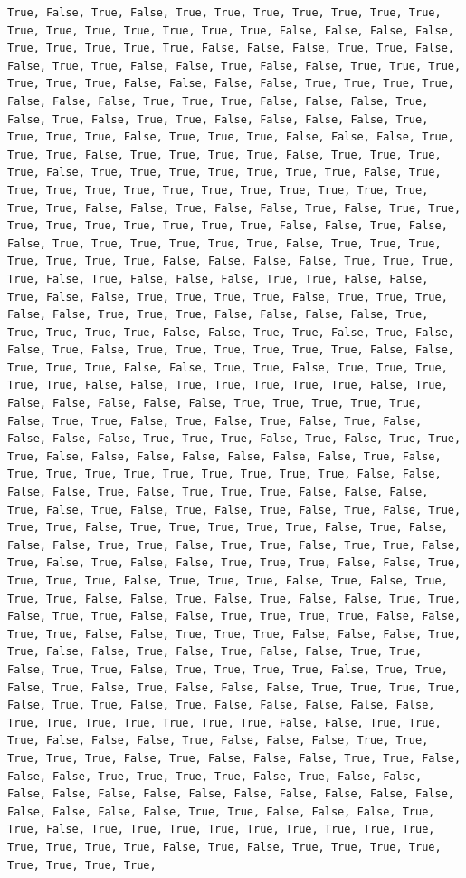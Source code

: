 \documentclass[
  letterpaper,
  DIV=11,
  numbers=noendperiod]{scrartcl}
\begin{document}
\begin{verbatim}
True, False, True, False, True, True, True, True, True, True, True, True, True, True, True, True, True, True, False, False, False, False, True, True, True, True, True, False, False, False, True, True, False, False, True, True, False, False, True, False, False, True, True, True, True, True, True, False, False, False, False, True, True, True, True, False, False, False, True, True, True, False, False, False, True, False, True, False, True, True, False, False, False, False, True, True, True, True, False, True, True, True, False, False, False, True, True, True, False, True, True, True, True, False, True, True, True, True, False, True, True, True, True, True, True, True, False, True, True, True, True, True, True, True, True, True, True, True, True, True, True, False, False, True, False, False, True, False, True, True, True, True, True, True, True, True, True, False, False, True, False, False, True, True, True, True, True, True, False, True, True, True, True, True, True, True, False, False, False, False, True, True, True, True, False, True, False, False, False, True, True, False, False, True, False, False, True, True, True, True, False, True, True, True, False, False, True, True, True, False, False, False, False, True, True, True, True, True, False, False, True, True, False, True, False, False, True, False, True, True, True, True, True, True, False, False, True, True, True, False, False, True, True, False, True, True, True, True, True, False, False, True, True, True, True, True, False, True, False, False, False, False, False, True, True, True, True, True, False, True, True, False, True, False, True, False, True, False, False, False, False, True, True, True, False, True, False, True, True, True, False, False, False, False, False, False, False, True, False, True, True, True, True, True, True, True, True, True, False, False, False, False, True, False, True, True, True, False, False, False, True, False, True, False, True, False, True, False, True, False, True, True, True, False, True, True, True, True, True, False, True, False, False, False, True, True, False, True, True, False, True, True, False, True, False, True, False, False, True, True, True, False, False, True, True, True, True, False, True, True, True, False, True, False, True, True, True, False, False, True, False, True, False, False, True, True, False, True, True, False, False, True, True, True, True, False, False, True, True, False, False, True, True, True, False, False, False, True, True, False, False, True, False, True, False, False, True, True, False, True, True, False, True, True, True, True, False, True, True, False, True, False, True, False, False, False, True, True, True, True, False, True, True, False, True, False, False, False, False, False, True, True, True, True, True, True, True, False, False, True, True, True, False, False, False, True, False, False, False, True, True, True, True, True, False, True, False, False, False, True, True, False, False, False, True, True, True, True, False, True, False, False, False, False, False, False, False, False, False, False, False, False, False, False, False, False, True, True, False, False, False, True, True, False, True, True, True, True, True, True, True, True, True, True, True, True, True, False, True, False, True, True, True, True, True, True, True, True, 
\end{verbatim}
\end{document}

